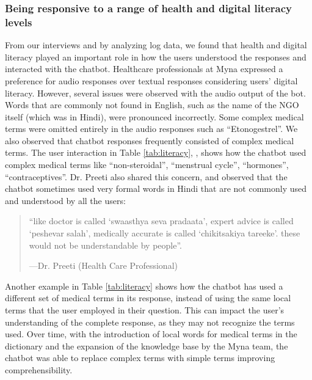 \subsubsection{Being responsive to a range of health and digital literacy levels}
From our interviews and by analyzing log data, we found that health and digital literacy played an important role in how the users understood the responses and interacted with the chatbot. 
Healthcare professionals at Myna expressed a preference for audio responses over textual responses considering users' digital literacy. However, several issues were observed with the audio output of the bot. Words that are commonly not found in English, such as the name of the NGO itself (which was in Hindi), were pronounced incorrectly. 
Some complex medical terms were omitted entirely in the audio responses such as ``Etonogestrel''.
We also observed that chatbot responses frequently consisted of complex medical terms.
The user interaction in Table \ref{tab:literacy}, , shows how the chatbot used complex medical terms like ``non-steroidal'', ``menstrual cycle'', ``hormones'', ``contraceptives''.
Dr. Preeti also shared this concern, and observed that the chatbot sometimes used very formal words in Hindi that are not commonly used and understood by all the users:

\begin{quote}
``like doctor is called `swaasthya seva pradaata', expert advice is called `peshevar salah', medically accurate is called `chikitsakiya tareeke'. these would not be understandable by people''. 

—Dr. Preeti (Health Care Professional)
\end{quote} 

Another example in Table \ref{tab:literacy}  shows how the chatbot has used a different set of medical terms in its response, instead of using the same local terms that the user employed in their question. 
This can impact the user's understanding of the complete response, as they may not recognize the terms used. 
Over time, with the introduction of local words for medical terms in the dictionary and the expansion of the knowledge base by the Myna team, the chatbot was able to replace complex terms with simple terms improving comprehensibility.

